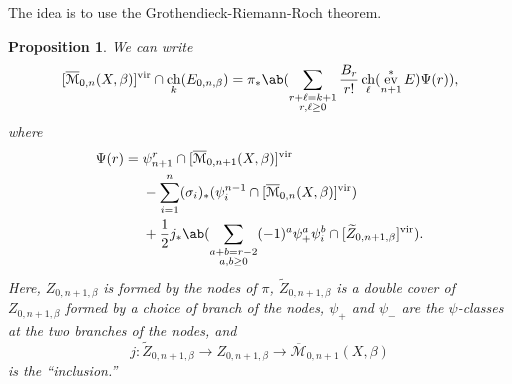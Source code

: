 \documentclass[leqno, openany]{memoir}
\newtheorem{prop}[thm]{Proposition}
\theoremstyle{definition}
\theoremstyle{remark}
\theoremstyle{plain}
\theoremstyle{definition}
\theoremstyle{remark}
\newcommand{\mr}[1]{\mathrm{#1}}
\newcommand{\wt}[1]{\widetilde{#1}}
\newcommand{\vir}{\mr{vir}}
\newcommand{\Mbar}{\overline{\mathcal{M}}}
\DeclareMathOperator{\ch}{ch}
\DeclareMathOperator{\ev}{ev}
\begin{document}
The idea is to use the Grothendieck-Riemann-Roch theorem.

\begin{prop}
    We can write
    \[ [\Mbar_{0,n}(X,\beta)]^{\vir} \cap \ch_k(E_{0,n,\beta}) = \pi_* \ab(\sum_{\substack{r+\ell=k+1 \\ r,\ell \geq 0}} \frac{B_r}{r!} \ch_{\ell}(\ev^*_{n+1} E) \Psi(r)), \]
    where
    \begin{align*}
        \Psi(r) ={}& \psi_{n+1}^r \cap [\Mbar_{0,n+1}(X,\beta)]^{\vir} \\ 
        &- \sum_{i=1}^n (\sigma_i)_* (\psi_i^{n-1} \cap [\Mbar_{0,n}(X,\beta)]^{\vir}) \\ 
        &+ \frac{1}{2} j_* \ab(\sum_{\substack{a+b=r-2 \\ a,b \geq 0}} (-1)^a \psi_+^a \psi_i^b \cap [\wt{Z}_{0,n+1,\beta}]^{\vir}). 
    \end{align*}
    Here, $Z_{0,n+1,\beta}$ is formed by the nodes of $\pi$, $\wt{Z}_{0,n+1,\beta}$ is a double cover of $Z_{0,n+1,\beta}$ formed by a choice of branch of the nodes,  $\psi_+$ and $\psi_-$ are the $\psi$-classes at the two branches of the nodes, and
    \[ j \colon \wt{Z}_{0,n+1,\beta} \to Z_{0,n+1,\beta} \to \Mbar_{0,n+1}(X,\beta) \]
    is the ``inclusion.''
\end{prop}
\end{document}

